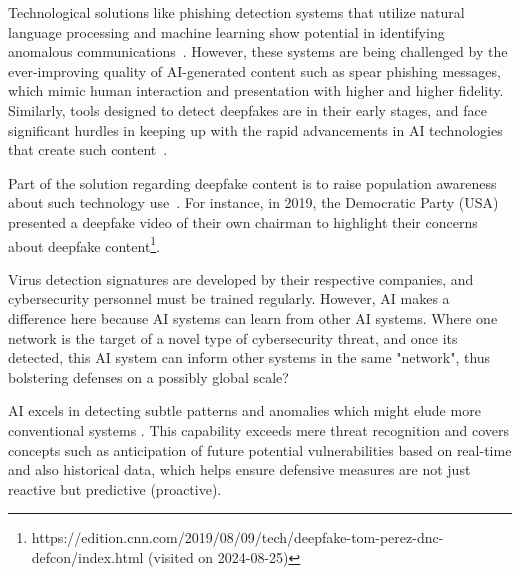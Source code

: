 Technological solutions like phishing detection systems that utilize natural language processing and machine learning show potential in identifying anomalous communications~\citep{basit_Comprehensive_Survey_AI_Phishing_Detection_2021}. However, these systems are being challenged by the ever-improving quality of AI-generated content such as spear phishing messages, which mimic human interaction and presentation with higher and higher fidelity. Similarly, tools designed to detect deepfakes are in their early stages, and face significant hurdles in keeping up with the rapid advancements in AI technologies that create such content~\citep{mirsky_Creation_Detection_Deepfakes_2021}.



Part of the solution regarding deepfake content is to raise population awareness about such technology use~\citep{blauth_AI_Crime_Overview_Malicious_Use_Abuse_2022}. For instance, in 2019, the Democratic Party (USA) presented a deepfake video of their own chairman to highlight their concerns about deepfake content\footnote{https://edition.cnn.com/2019/08/09/tech/deepfake-tom-perez-dnc-defcon/index.html (visited on 2024-08-25)}.

Virus detection signatures are developed by their respective companies, and cybersecurity personnel must be trained regularly. However, AI makes a difference here because AI systems can learn from other AI systems. Where one network is the target of a novel type of cybersecurity threat, and once its detected, this AI system can inform other systems in the same "network", thus bolstering defenses on a possibly global scale?


AI excels in detecting subtle patterns and anomalies which might elude more conventional systems \citep{fakhouri_AI_Driven_Solutions_SE_Attacks_2024}. This capability exceeds mere threat recognition and covers concepts such as anticipation of future potential vulnerabilities based on real-time and also historical data, which helps ensure defensive measures are not just reactive but predictive (proactive).

